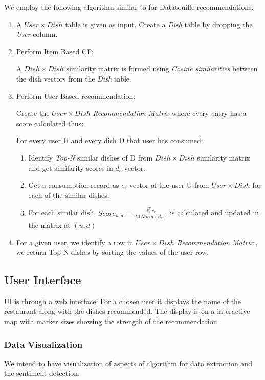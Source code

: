 \documentclass[twoside,12pt]{article}
\begin{document}
We employ the following algorithm similar to \cite{cf_online} for Datatouille recommendations.
\begin{enumerate}
\item
A $User \times Dish$  table is given as input. Create a \textit{Dish} table by dropping the \textit{User} column.
\item
Perform Item Based CF: 

A $Dish \times Dish$  similarity matrix is formed using \textit{Cosine similarities} between the dish vectors from the \textit{Dish}    table. 
\item
Perform User Based recommendation:

Create the $User \times Dish$   \textit{Recommendation Matrix} where every entry has a score calculated thus:

For every user U and every dish D that user has consumed:
\begin{enumerate}
\item
Identify \textit{Top-N} similar dishes of D from $Dish \times Dish$  similarity matrix and get similarity scores in $d_s$ vector.  
\item
Get a consumption record as  ${c_r}$  vector of the user U from  $User \times Dish$  for each of the similar dishes.
\item
For each similar dish, ${Score_{u,d}}$ =   $\frac{d_s^{T}  . c_r}{L1 Norm (d_s)}$ is calculated and updated in the matrix at ${(u,d)}$
\end{enumerate}
\item
For a given user, we identify a row in $User \times Dish$  \textit{Recommendation Matrix} , we return Top-N dishes by sorting the values of the user row.
\end{enumerate}

\subsection{User Interface}
UI is through a web interface. For a chosen user it displays the name of the restaurant along with the dishes recommended. The display is on a interactive map with marker sizes showing the strength of the recommendation.


\subsubsection{Data Visualization}
We intend to have visualization of aspects of algorithm for data extraction and the sentiment detection. 
\end{document}
